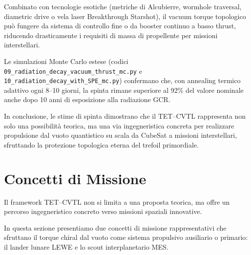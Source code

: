 \documentclass[11pt,a4paper]{article}
\theoremstyle{plain}
\theoremstyle{definition}
\begin{document}
\vspace{0.3cm}

Combinato con tecnologie esotiche (metriche di Alcubierre, wormhole traversal, diametric drive o vela laser Breakthrough Starshot), il vacuum torque topologico può fungere da sistema di controllo fine o da booster continuo a basso thrust, riducendo drasticamente i requisiti di massa di propellente per missioni interstellari.

\vspace{0.3cm}

Le simulazioni Monte Carlo estese (codici \texttt{09\_radiation\_decay\_vacuum\_thrust\_mc.py} e \texttt{10\_radiation\_decay\_with\_SPE\_mc.py}) confermano che, con annealing termico adattivo ogni 8–10 giorni, la spinta rimane superiore al 92\% del valore nominale anche dopo 10 anni di esposizione alla radiazione GCR.

\vspace{0.3cm}

In conclusione, le stime di spinta dimostrano che il TET--CVTL rappresenta non solo una possibilità teorica, ma una via ingegneristica concreta per realizzare propulsione dal vuoto quantistico su scala da CubeSat a missioni interstellari, sfruttando la protezione topologica eterna del trefoil primordiale.












\vspace{0.3cm}








\section{Concetti di Missione}

Il framework TET--CVTL non si limita a una proposta teorica, ma offre un percorso ingegneristico concreto verso missioni spaziali innovative. 

\vspace{0.2cm}

In questa sezione presentiamo due concetti di missione rappresentativi che sfruttano il torque chiral dal vuoto come sistema propulsivo ausiliario o primario: il lander lunare LEWE e lo scout interplanetario MES. 

\vspace{0.3cm}
\end{document}
